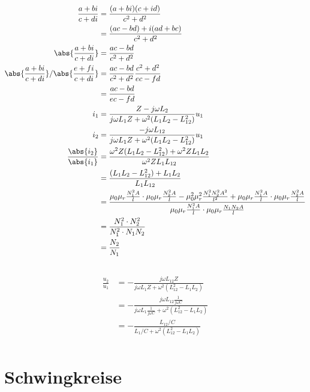 \documentclass[11pt]{article}
\begin{document}
\subsection{}
\begin{align*}\frac{a + bi}{c+ di} &= \frac{(a + bi)(c+id)}{c^2+ d^2}\\
    &= \frac{(ac - bd) + i(ad + bc)}{c^2+ d^2}\\
    \abs{\frac{a + bi}{c+ di}}&= \frac{ac - bd}{c^2+ d^2}\\
    \abs{\frac{a + bi}{c+ di}} /\abs{\frac{e + fi}{c+ di}}&= \frac{ac - bd}{c^2+ d^2} \frac{c^2+ d^2}{ec - fd}\\
    &= \frac{ac - bd}{ec - fd}\\
    i_1 &= \frac{Z - j \omega L_2}{j \omega L_1 Z + \omega^2 (L_1 L_2 - L_{12}^2)} u_1\\
    i_2 &= \frac{-j\omega L_{12}}{j \omega L_1 Z + \omega^2 (L_1 L_2 - L_{12}^2)} u_1\\
    \frac{\abs{i_2}}{\abs{i_1}} &=  \frac{\omega^2 Z (L_1 L_2 - L_{12}^2) + \omega^2 Z L_1 L_2}
    {\omega ^2 Z L_1 L_{12}}\\
    &=  \frac{(L_1 L_2 - L_{12}^2) +  L_1 L_2}
    {L_1 L_{12}}\\
    &= \frac{{\mu_0 \mu_{r} \frac{N_1^2 A }{l} \cdot \mu_0 \mu_{r} \frac{N_2^2 A }{l}} 
    - \mu_0^2 \mu_{r}^2 \frac{N_1^2 N_2^2 A^2 }{l^2} +  
    \mu_0 \mu_{r} \frac{N_1^2 A }{l} \cdot \mu_0 \mu_{r} \frac{N_2^2 A }{l}}
    {\mu_0 \mu_{r} \frac{N_1^2 A }{l}\cdot  \mu_0 \mu_{r} \frac{N_1 N_2 A }{l}}\\
    &= \frac{N_1^2 \cdot N_2^2}
    {N_1^2\cdot N_1 N_2}\\
    &= \frac{N_2}{N_1}\\ 
\end{align*}

\subsection{}
\begin{align*}
    \frac{u_2}{u_1} &= -\frac{j\omega L_{12} Z}{j\omega L_1 Z + \omega^2 (L_{12}^2-L_1 L_2)}\\
    &= -\frac{j\omega L_{12} \frac{1}{j \omega C}}{j\omega L_1 \frac{1}{j \omega C} + \omega^2 (L_{12}^2-L_1 L_2)}\\
    &= -\frac{L_{12}/C}{L_1 /C + \omega^2 (L_{12}^2-L_1 L_2)}\\
\end{align*}

\section{Schwingkreise}
\end{document}

